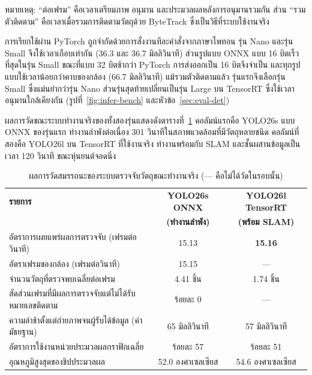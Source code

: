 \documentclass[a4paper,12pt]{report}
\begin{document}
หมายเหตุ: ``ต่อเฟรม'' คือเวลาเตรียมภาพ อนุมาน และประมวลผลหลังการอนุมานรวมกัน
ส่วน ``รวมตัวติดตาม'' คือเวลาเมื่อรวมการติดตามวัตถุด้วย ByteTrack ซึ่งเป็นวิธีที่ระบบใช้งานจริง

การเรียกใช้ผ่าน PyTorch ถูกจำกัดด้วยการสั่งงานทีละคำสั่งจากภาษาไพทอน
รุ่น Nano และรุ่น Small จึงใช้เวลาเกือบเท่ากัน (36.3 และ 36.7 มิลลิวินาที)
ส่วนรูปแบบ ONNX แบบ 16 บิตเร็วที่สุดในรุ่น Small ขณะที่แบบ 32 บิตช้ากว่า PyTorch
การส่งออกเป็น 16 บิตจึงจำเป็น และทุกรูปแบบใช้เวลาน้อยกว่าคาบของกล้อง (66.7 มิลลิวินาที) แม้รวมตัวติดตามแล้ว
รุ่นแรกจึงเลือกรุ่น Small ซึ่งแม่นยำกว่ารุ่น Nano
ส่วนรุ่นสุดท้ายเปลี่ยนเป็นรุ่น Large บน TensorRT ซึ่งใช้เวลาอนุมานใกล้เคียงกัน
(รูปที่~\ref{fig:infer-bench} และหัวข้อ~\ref{sec:eval-det})

ผลการวัดขณะระบบทำงานจริงของทั้งสองรุ่นแสดงดังตารางที่~\ref{tab:modellive}
คอลัมน์แรกคือ YOLO26s แบบ ONNX ของรุ่นแรก ทำงานลำพังต่อเนื่อง 301 วินาทีในสภาพแวดล้อมที่มีวัตถุหลายชนิด
คอลัมน์ที่สองคือ YOLO26l บน TensorRT ที่ใช้งานจริง ทำงานพร้อมกับ SLAM และชั้นผสานข้อมูลเป็นเวลา 120 วินาที
ขณะหุ่นยนต์จอดนิ่ง

\begin{table}[H]
\centering
\caption[ผลการวัดสมรรถนะของระบบตรวจจับวัตถุขณะทำงานจริง (บทที่ 4)]{ผลการวัดสมรรถนะของระบบตรวจจับวัตถุขณะทำงานจริง
(--- คือไม่ได้วัดในรอบนั้น)}
\label{tab:modellive}
\small
\begin{tabularx}{\textwidth}{|X|c|c|}
\hline
\textbf{รายการ} & \textbf{YOLO26s ONNX} & \textbf{YOLO26l TensorRT} \\
 & \textbf{(ทำงานลำพัง)} & \textbf{(พร้อม SLAM)} \\
\hline
อัตราการเผยแพร่ผลการตรวจจับ (เฟรมต่อวินาที) & 15.13 & \textbf{15.16} \\
\hline
อัตราเฟรมของกล้อง (เฟรมต่อวินาที) & 15.15 & --- \\
\hline
จำนวนวัตถุที่ตรวจพบเฉลี่ยต่อเฟรม & 4.41 ชิ้น & 1.74 ชิ้น \\
\hline
สัดส่วนเฟรมที่มีผลการตรวจจับแต่ไม่ได้รับหมายเลขติดตาม & ร้อยละ 0 & --- \\
\hline
ความล่าช้าตั้งแต่ถ่ายภาพจนผู้รับได้ข้อมูล (ค่ามัธยฐาน) & 65 มิลลิวินาที & 57 มิลลิวินาที \\
\hline
อัตราการใช้งานหน่วยประมวลผลกราฟิกเฉลี่ย & ร้อยละ 57 & ร้อยละ 51 \\
\hline
อุณหภูมิสูงสุดของชิปประมวลผล & 52.0 องศาเซลเซียส & 54.6 องศาเซลเซียส \\
\hline
\end{tabularx}
\end{table}
\end{document}
